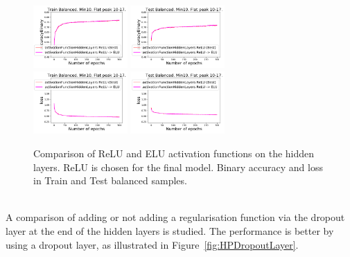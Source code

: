 \begin{figure}[!htb]
\centering
\includegraphics[width=0.32\textwidth]{plots/plot_01_1_overlay_graph_accuracyBinary_Train_ActivationFunctionHiddenLayers.pdf}
\includegraphics[width=0.32\textwidth]{plots/plot_01_1_overlay_graph_accuracyBinary_Test_ActivationFunctionHiddenLayers.pdf}\\
\includegraphics[width=0.32\textwidth]{plots/plot_01_1_overlay_graph_loss_Train_ActivationFunctionHiddenLayers.pdf}
\includegraphics[width=0.32\textwidth]{plots/plot_01_1_overlay_graph_loss_Test_ActivationFunctionHiddenLayers.pdf}\\
\caption{Comparison of ReLU and ELU activation functions on the hidden layers. ReLU is chosen for the final model. Binary accuracy and loss in Train and Test balanced samples.}
\label{fig:HPActivationFunctionHiddenLayers}
\end{figure}

\ \\A comparison of adding or not adding a regularisation function via the dropout layer at the end of the hidden layers is studied. The performance is better by using a dropout layer, as illustrated in Figure~\ref{fig:HPDropoutLayer}.

